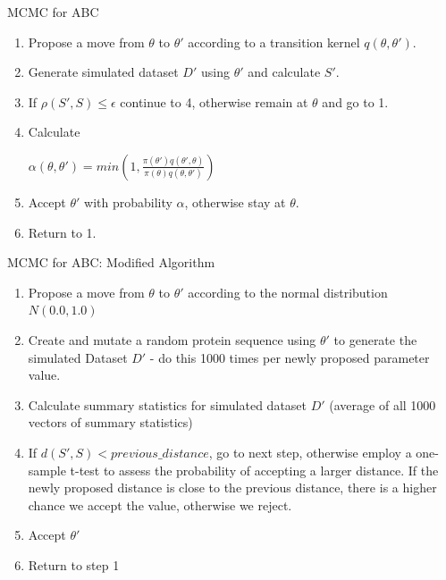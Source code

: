 \documentclass{beamer}
\begin{document}
	\begin{frame}{MCMC for ABC}
		
		\begin{enumerate}
			\item Propose a move from $\theta$ to $\theta'$ according to a transition kernel $q(\theta,\theta')$.
			\item Generate simulated dataset $D'$ using $\theta'$ and calculate $S'$.
			\item If $\rho(S', S) \le \epsilon$ continue to 4, otherwise remain at $\theta$ and go to 1.
			\item Calculate \newline \begin{center}$\alpha(\theta, \theta') = min(1, \frac{\pi(\theta')q(\theta',\theta)}{\pi(\theta)q(\theta, \theta')})$ \end{center}
			\item Accept $\theta'$ with probability $\alpha$, otherwise stay at $\theta$.
			\item Return to 1.
		\end{enumerate}
	
		\vspace{2cm}\tiny\cite{marjoram2003markov}
	\end{frame}

	\begin{frame}{MCMC for ABC: Modified Algorithm}
	
		\begin{enumerate}
			\item Propose a move from $\theta$ to $\theta'$ according to the normal distribution $N(0.0,1.0)$
			\item Create and mutate a random protein sequence using $\theta'$ to generate the simulated Dataset $D'$ - do this 1000 times per newly proposed parameter value.
			\item Calculate summary statistics for simulated dataset $D'$ (average of all 1000 vectors of summary statistics)
			\item If $d(S',S) < previous\_distance$, go to next step, otherwise employ a one-sample t-test to assess the probability of accepting a larger distance. If the newly proposed distance is close to the previous distance, there is a higher chance we accept the value, otherwise we reject.
			\item Accept $\theta'$ 
			\item Return to step 1
		\end{enumerate}
	
	\end{frame}
\end{document}
